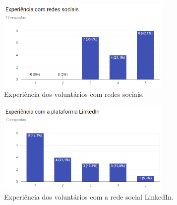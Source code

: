 \begin{figure}[H]
    \caption{Experiência dos voluntários com redes sociais.}
       	\begin{center}
            \includegraphics[width=0.75\textwidth]{figuras/avaliacao/xp-redes-sociais.png}
        \end{center}
    \label{avalGrafRedesSociais}
\end{figure} 

\begin{figure}[H]
    \caption{Experiência dos voluntários com a rede social LinkedIn.}
       	\begin{center}
            \includegraphics[width=0.75\textwidth]{figuras/avaliacao/xp-linkedin.png}
        \end{center}
    \label{avalGrafLinkedin}
\end{figure}

